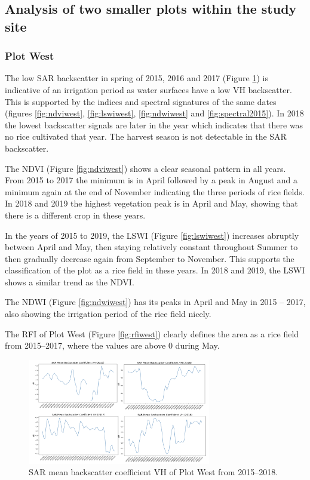 \documentclass[a4paper, 10pt, conference]{ieeeconf}      %
\begin{document}
\subsection{Analysis of two smaller plots within the study site}
 
\subsubsection{Plot West}
The low SAR backscatter in spring of 2015, 2016 and 2017 (Figure \ref{fig:sarwest}) is indicative of an irrigation period as water surfaces have a low VH backscatter. This is supported by the indices and spectral signatures of the same dates (figures \ref{fig:ndviwest}, \ref{fig:lswiwest}, \ref{fig:ndwiwest} and \ref{fig:spectral2015}). In 2018 the lowest backscatter signals are later in the year which indicates that there was no rice cultivated that year. The harvest season is not detectable in the SAR backscatter.

The NDVI (Figure \ref{fig:ndviwest}) shows a clear seasonal pattern in all years. From 2015 to 2017 the minimum is in April followed by a peak in August and a minimum again at the end of November indicating the three periods of rice fields. In 2018 and 2019 the highest vegetation peak is in April and May, showing that there is a different crop in these years.

In the years of 2015 to 2019, the LSWI (Figure \ref{fig:lswiwest}) increases abruptly between April and May, then staying relatively constant throughout Summer to then gradually decrease again from September to November. This supports the classification of the plot as a rice field in these years. In 2018 and 2019, the LSWI shows a similar trend as the NDVI.

The NDWI (Figure \ref{fig:ndwiwest}) has its peaks in April and May in 2015 – 2017, also showing the irrigation period of the rice field nicely.

The RFI of Plot West (Figure \ref{fig:rfiwest}) clearly defines the area as a rice field from 2015–2017, where the values are above 0 during May.

\begin{figure}[h]
\centering
\includegraphics[width=8cm]{Figures/SAR_west.png}
\caption{SAR mean backscatter coefficient VH of Plot West from 2015–2018.}
\label{fig:sarwest}
\end{figure}
\end{document}
